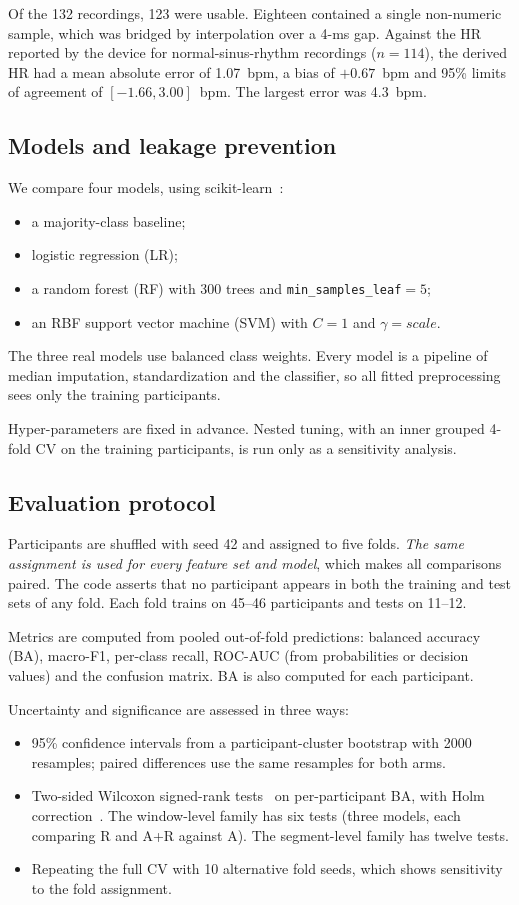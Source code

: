 \documentclass[conference]{IEEEtran}
\begin{document}
Of the 132 recordings, 123 were usable. Eighteen contained a single non-numeric sample, which was bridged by interpolation over a 4-ms gap. Against the HR reported by the device for normal-sinus-rhythm recordings ($n=114$), the derived HR had a mean absolute error of 1.07~bpm, a bias of $+0.67$~bpm and 95\% limits of agreement of $[-1.66, 3.00]$~bpm. The largest error was 4.3~bpm.

\subsection{Models and leakage prevention}
We compare four models, using scikit-learn~\cite{pedregosa2011sklearn}:
\begin{itemize}
\item a majority-class baseline;
\item logistic regression (LR);
\item a random forest (RF) with 300 trees and \texttt{min\_samples\_leaf}$=5$;
\item an RBF support vector machine (SVM) with $C=1$ and $\gamma=\textit{scale}$.
\end{itemize}
The three real models use balanced class weights. Every model is a pipeline of median imputation, standardization and the classifier, so all fitted preprocessing sees only the training participants.

Hyper-parameters are fixed in advance. Nested tuning, with an inner grouped 4-fold CV on the training participants, is run only as a sensitivity analysis.

\subsection{Evaluation protocol}
Participants are shuffled with seed 42 and assigned to five folds. \emph{The same assignment is used for every feature set and model}, which makes all comparisons paired. The code asserts that no participant appears in both the training and test sets of any fold. Each fold trains on 45--46 participants and tests on 11--12.

Metrics are computed from pooled out-of-fold predictions: balanced accuracy (BA), macro-F1, per-class recall, ROC-AUC (from probabilities or decision values) and the confusion matrix. BA is also computed for each participant.

Uncertainty and significance are assessed in three ways:
\begin{itemize}
\item 95\% confidence intervals from a participant-cluster bootstrap with 2000 resamples; paired differences use the same resamples for both arms.
\item Two-sided Wilcoxon signed-rank tests~\cite{wilcoxon1945} on per-participant BA, with Holm correction~\cite{holm1979}. The window-level family has six tests (three models, each comparing R and A+R against A). The segment-level family has twelve tests.
\item Repeating the full CV with 10 alternative fold seeds, which shows sensitivity to the fold assignment.
\end{itemize}
\end{document}
